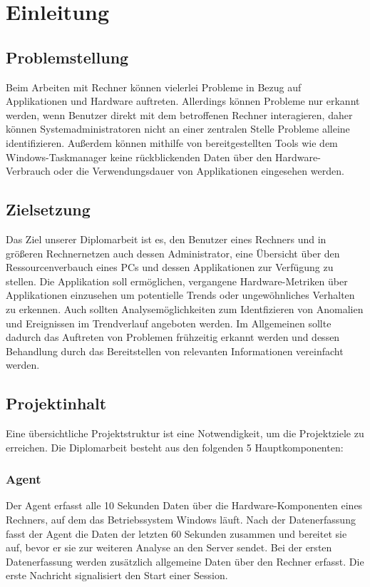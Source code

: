 \documentclass{report}
\begin{document}
\chapter{Einleitung}
\section{Problemstellung}
Beim Arbeiten mit Rechner können vielerlei Probleme in Bezug auf Applikationen und Hardware auftreten. Allerdings können Probleme nur erkannt werden, wenn Benutzer direkt mit dem betroffenen Rechner interagieren, daher können Systemadministratoren nicht an einer zentralen Stelle Probleme alleine identifizieren. Außerdem können mithilfe von bereitgestellten Tools wie dem Windows-Taskmanager keine rückblickenden Daten über den Hardware-Verbrauch oder die Verwendungsdauer von Applikationen eingesehen werden.
\section{Zielsetzung}
Das Ziel unserer Diplomarbeit ist es, den Benutzer eines Rechners und in größeren Rechnernetzen auch dessen Administrator, eine Übersicht über den Ressourcenverbauch eines PCs und dessen Applikationen zur Verfügung zu stellen. Die Applikation soll ermöglichen, vergangene Hardware-Metriken über Applikationen einzusehen um potentielle Trends oder ungewöhnliches Verhalten zu erkennen. Auch sollten Analysemöglichkeiten zum Identfizieren von Anomalien und Ereignissen im Trendverlauf angeboten werden. Im Allgemeinen sollte dadurch das Auftreten von Problemen frühzeitig erkannt werden und dessen Behandlung durch das Bereitstellen von relevanten Informationen vereinfacht werden.
\section{Projektinhalt}
Eine übersichtliche Projektstruktur ist eine Notwendigkeit, um die Projektziele zu erreichen. Die Diplomarbeit besteht aus den folgenden 5 Hauptkomponenten:
\subsection{Agent}
Der Agent erfasst alle 10 Sekunden Daten über die Hardware-Komponenten eines Rechners, auf dem das Betriebssystem Windows läuft. Nach der Datenerfassung fasst der Agent die Daten der letzten 60 Sekunden zusammen und bereitet sie auf, bevor er sie zur weiteren Analyse an den Server sendet. Bei der ersten Datenerfassung werden zusätzlich allgemeine Daten über den Rechner erfasst. Die erste Nachricht signalisiert den Start einer Session.
\end{document}
